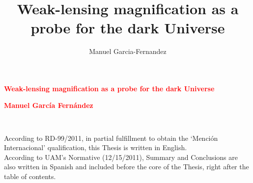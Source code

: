 \documentclass[12pt]{book} %
\begin{document}

\begingroup
\thispagestyle{empty}
\setcounter{page}{1}

\centering
\vspace*{5cm}
\par\normalfont\fontsize{27}{27}\sffamily\selectfont
\textcolor{red}{\textbf{Weak-lensing magnification as a probe for the dark Universe}}\par %
\vspace*{1cm}
\textcolor{red}{\textbf{\Huge Manuel Garc\'ia Fern\'andez}}\par %

\title{Weak-lensing magnification as a probe for the dark Universe}
\author{Manuel Garcia-Fernandez}
\endgroup


\newpage
~\vfill
\thispagestyle{empty}



\newpage
\noindent
According to RD-99/2011, in partial fulfillment to obtain the `Menci\'on Internacional' qualification, this Thesis is written in English.\\
According to UAM's Normative (12/15/2011), Summary and Conclusions are also written in Spanish and included before the core of the Thesis, right after the table of contents.\\
\end{document}
